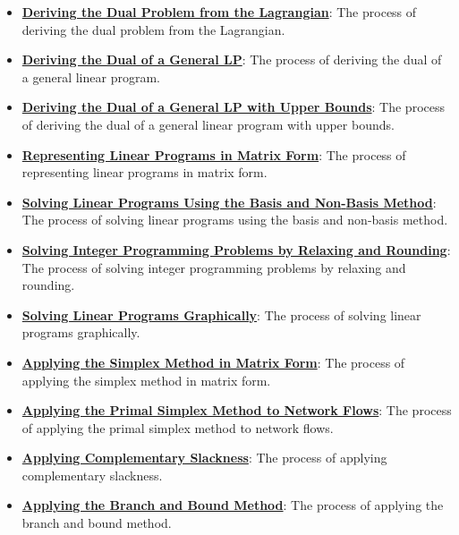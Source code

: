 \documentclass{article}%
\begin{document}
\begin{itemize}[leftmargin=*]
\item \href{https://www.math.purdue.edu/~yipn/421/2024-11-14-NetAppls.pdf#page=7}{\textbf{Deriving the Dual Problem from the Lagrangian}}: The process of deriving the dual problem from the Lagrangian.%
\item \href{https://www.math.purdue.edu/~yipn/421/2024-11-14-NetAppls.pdf#page=7}{\textbf{Deriving the Dual of a General LP}}: The process of deriving the dual of a general linear program.%
\item \href{https://www.math.purdue.edu/~yipn/421/2024-11-14-NetAppls.pdf#page=7}{\textbf{Deriving the Dual of a General LP with Upper Bounds}}: The process of deriving the dual of a general linear program with upper bounds.%
\item \href{https://www.math.purdue.edu/~yipn/421/2024-11-14-NetAppls.pdf#page=7}{\textbf{Representing Linear Programs in Matrix Form}}: The process of representing linear programs in matrix form.%
\item \href{https://www.math.purdue.edu/~yipn/421/2024-11-14-NetAppls.pdf#page=7}{\textbf{Solving Linear Programs Using the Basis and Non{-}Basis Method}}: The process of solving linear programs using the basis and non-basis method.%
\item \href{https://www.math.purdue.edu/~yipn/421/2024-11-14-NetAppls.pdf#page=7}{\textbf{Solving Integer Programming Problems by Relaxing and Rounding}}: The process of solving integer programming problems by relaxing and rounding.%
\item \href{https://www.math.purdue.edu/~yipn/421/2024-11-14-NetAppls.pdf#page=7}{\textbf{Solving Linear Programs Graphically}}: The process of solving linear programs graphically.%
\item \href{https://www.math.purdue.edu/~yipn/421/2024-11-14-NetAppls.pdf#page=7}{\textbf{Applying the Simplex Method in Matrix Form}}: The process of applying the simplex method in matrix form.%
\item \href{https://www.math.purdue.edu/~yipn/421/2024-11-14-NetAppls.pdf#page=7}{\textbf{Applying the Primal Simplex Method to Network Flows}}: The process of applying the primal simplex method to network flows.%
\item \href{https://www.math.purdue.edu/~yipn/421/2024-11-14-NetAppls.pdf#page=7}{\textbf{Applying Complementary Slackness}}: The process of applying complementary slackness.%
\item \href{https://www.math.purdue.edu/~yipn/421/2024-11-14-NetAppls.pdf#page=7}{\textbf{Applying the Branch and Bound Method}}: The process of applying the branch and bound method.%

\end{itemize}
\end{document}
